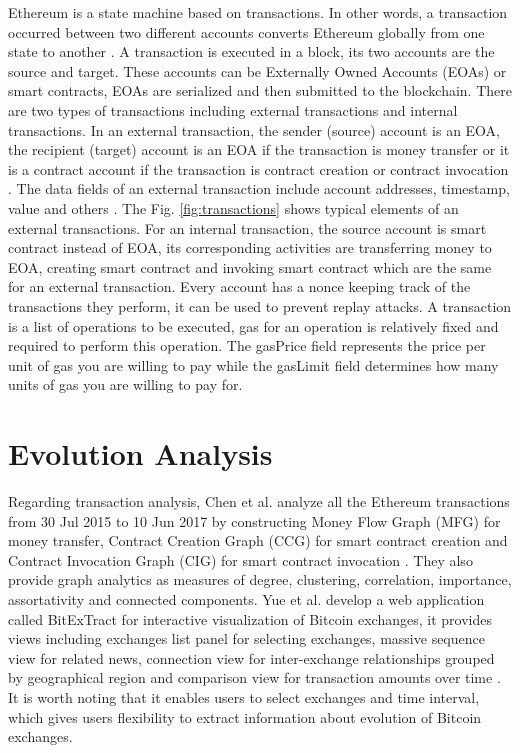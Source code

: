 Ethereum is a state machine based on transactions. In other words, a transaction occurred between two different accounts converts Ethereum globally from one state to another \cite{13}. A transaction is executed in a block, its two accounts are the source and target. These accounts can be Externally Owned Accounts (EOAs) or smart contracts, EOAs are serialized and then submitted to the blockchain. There are two types of transactions including external transactions and internal transactions. In an external transaction, the sender (source) account is an EOA, the recipient (target) account is an EOA if the transaction is money transfer or it is a contract account if the transaction is contract creation or contract invocation \cite{14}. The data fields of an external transaction include account addresses, timestamp, value and others \cite{16}. The Fig. \ref{fig:transactions} shows typical elements of an external transactions. For an internal transaction, the source account is smart contract instead of EOA, its corresponding activities are transferring money to EOA, creating smart contract and invoking smart contract which are the same for an external transaction. Every account has a nonce keeping track of the transactions they perform, it can be used to prevent replay attacks. A transaction is a list of operations to be executed, gas for an operation is relatively fixed and required to perform this operation. The gasPrice field represents the price per unit of gas you are willing to pay while the gasLimit field determines how many units of gas you are willing to pay for.

\section{Evolution Analysis}
\label{sec:review:evolution}

Regarding transaction analysis, Chen et al. analyze all the Ethereum transactions from 30 Jul 2015 to 10 Jun 2017 by constructing Money Flow Graph (MFG) for money transfer, Contract Creation Graph (CCG) for smart contract creation and Contract Invocation Graph (CIG) for smart contract invocation \cite{3}. They also provide graph analytics as measures of degree, clustering, correlation, importance, assortativity and connected components. Yue et al. develop a web application called BitExTract for interactive visualization of Bitcoin exchanges, it provides views including exchanges list panel for selecting exchanges, massive sequence view for related news, connection view for inter-exchange relationships grouped by geographical region and comparison view for transaction amounts over time \cite{19}. It is worth noting that it enables users to select exchanges and time interval, which gives users flexibility to extract information about evolution of Bitcoin exchanges.

